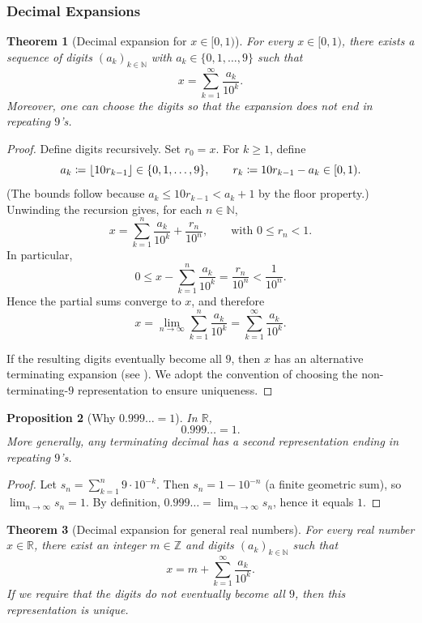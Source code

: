 \documentclass[12pt]{article}
\numberwithin{equation}{section}
\newcommand{\RR}{\mathbb{R}}
\newcommand{\ZZ}{\mathbb{Z}}
\newcommand{\NN}{\mathbb{N}}
\DeclarePairedDelimiter{\floor}{\lfloor}{\rfloor}
\theoremstyle{plain}
\newtheorem{theorem}{Theorem}[section]
\newtheorem{proposition}[theorem]{Proposition}
\theoremstyle{definition}
\theoremstyle{remark}
\begin{document}
\subsubsection{Decimal Expansions}

\begin{theorem}[Decimal expansion for $x\in[0,1)$]\label{thm:decimal-01}
For every $x\in[0,1)$, there exists a sequence of digits $(a_k)_{k\in\NN}$ with $a_k\in\{0,1,\dots,9\}$ such that
\[
x = \sum_{k=1}^{\infty} \frac{a_k}{10^k}.
\]
Moreover, one can choose the digits so that the expansion does not end in repeating $9$'s.
\end{theorem}

\begin{proof}
Define digits recursively. Set $r_0=x$. For $k\ge 1$, define
\[
a_k \coloneqq \floor{10r_{k-1}} \in \{0,1,\dots,9\},
\qquad
r_k \coloneqq 10r_{k-1} - a_k \in [0,1).
\]
(The bounds follow because $a_k \le 10r_{k-1}<a_k+1$ by the floor property.)
Unwinding the recursion gives, for each $n\in\NN$,
\begin{equation}\label{eq:decimal-partial}
x = \sum_{k=1}^{n} \frac{a_k}{10^k} + \frac{r_n}{10^n},
\qquad \text{with } 0\le r_n < 1.
\end{equation}
In particular,
\[
0 \le x - \sum_{k=1}^{n} \frac{a_k}{10^k} = \frac{r_n}{10^n} < \frac{1}{10^n}.
\]
Hence the partial sums converge to $x$, and therefore
\[
x = \lim_{n\to\infty} \sum_{k=1}^{n} \frac{a_k}{10^k}
= \sum_{k=1}^{\infty} \frac{a_k}{10^k}.
\]

If the resulting digits eventually become all $9$, then $x$ has an alternative terminating expansion (see ). We adopt the convention of choosing the non-terminating-$9$ representation to ensure uniqueness.
\end{proof}

\begin{proposition}[Why $0.999\ldots=1$]\label{prop:999}
In $\RR$,
\[
0.999\ldots = 1.
\]
More generally, any terminating decimal has a second representation ending in repeating $9$'s.
\end{proposition}

\begin{proof}
Let $s_n=\sum_{k=1}^{n} 9\cdot 10^{-k}$. Then $s_n=1-10^{-n}$ (a finite geometric sum), so $\lim_{n\to\infty} s_n = 1$.
By definition, $0.999\ldots=\lim_{n\to\infty} s_n$, hence it equals $1$.
\end{proof}

\begin{theorem}[Decimal expansion for general real numbers]\label{thm:decimal-R}
For every real number $x\in\RR$, there exist an integer $m\in\ZZ$ and digits $(a_k)_{k\in\NN}$ such that
\[
x = m + \sum_{k=1}^{\infty} \frac{a_k}{10^k}.
\]
If we require that the digits do not eventually become all $9$, then this representation is unique.
\end{theorem}
\end{document}
